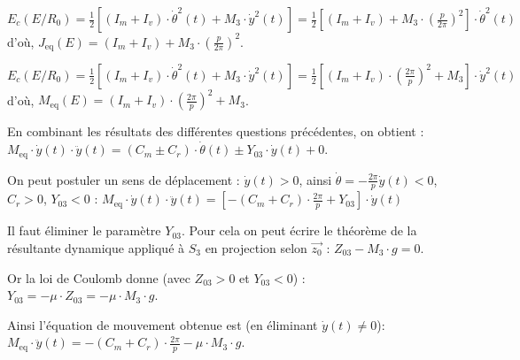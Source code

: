 
\ifprof\begin{corrige}
$E_c(E/R_0)=\frac{1}{2}\left[\left(I_m+I_v\right)\cdot \dot{\theta}^2(t)+ M_3\cdot \dot{y}^2(t)\right]
=\frac{1}{2}\left[\left(I_m+I_v\right)+ M_3\cdot \left(\frac{p}{2\pi}\right)^2\right]\cdot \dot{\theta}^2(t)$
d'où,
$
J_{\text{eq}}(E)=\left(I_m+I_v\right)+ M_3\cdot \left(\frac{p}{2\pi}\right)^2$. \end{corrige}\else\fi

\ifprof\begin{corrige}
$E_c(E/R_0)=\frac{1}{2}\left[\left(I_m+I_v\right)\cdot \dot{\theta}^2(t)+ M_3\cdot \dot{y}^2(t)\right]
=\frac{1}{2}\left[\left(I_m+I_v\right)\cdot \left(\frac{2\pi}{p}\right)^2+ M_3\right]\cdot \dot{y}^2(t)$
d'où,
$
M_{\text{eq}}(E)=\left(I_m+I_v\right)\cdot \left(\frac{2\pi}{p}\right)^2+ M_3
$.

\end{corrige}\else\fi



\ifprof\begin{corrige}
En combinant les résultats des différentes questions précédentes, on obtient : 
$M_{\text{eq}}\cdot \dot{y}(t)\cdot \ddot{y}(t)=\left(C_m\pm C_r\right)\cdot \dot{\theta}(t)\pm Y_{03}\cdot \dot{y}(t)+0
$.

On peut postuler un sens de déplacement : $\dot{y}(t)>0$, ainsi $\dot{\theta}=-\frac{2\pi}{p}\dot{y}(t)<0$,  $C_r>0$, $Y_{03}<0$ : 
$
M_{\text{eq}}\cdot \dot{y}(t)\cdot \ddot{y}(t)=\left[-\left(C_m+ C_r\right)\cdot \frac{2\pi}{p}+ Y_{03}\right]\cdot \dot{y}(t)$
\end{corrige}\else\fi




\ifprof\begin{corrige}
Il faut éliminer le paramètre $Y_{03}$. Pour cela on peut écrire le théorème de la résultante dynamique appliqué à $S_3$ en projection selon $\overrightarrow{z_0}$ : 
$Z_{03}-M_3\cdot g=0$.

Or la loi de Coulomb donne (avec $Z_{03}>0$ et $Y_{03}<0$) : 
$Y_{03}=-\mu\cdot Z_{03}=-\mu\cdot M_3\cdot g$.

Ainsi l'équation de mouvement obtenue est (en éliminant $\dot{y}(t)\neq 0$): 
$
\boxed{
M_{\text{eq}}\cdot \ddot{y}(t)=-\left(C_m+ C_r\right)\cdot \frac{2\pi}{p}- \mu\cdot M_3\cdot g
}$. 
\end{corrige}\else\fi

